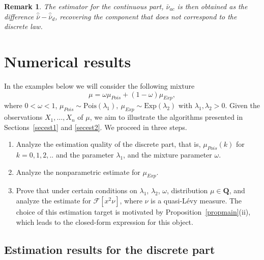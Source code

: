 \documentclass[numbers,webpdf,imaiai]{ima-authoring-template}%
\theoremstyle{thmstyletwo}%
\newtheorem{remark}{Remark}%
\newcommand{\R}{\mathbb{R}}
\newcommand{\F}{\mathcal{F}}
\newcommand{\Q}{\pmb{Q}}
\newcommand{\w}{\omega}
\numberwithin{equation}{section}
\begin{document}
\begin{remark}
The estimator for the continuous part, $\bar{\nu}_{ac}$ is then obtained as the difference $\widehat{\bar{\nu}} - \widehat{\bar{\nu}}_d$, recovering the component that does not correspond to the discrete law. %
\end{remark}

\section{Numerical results}\label{numerical_results}
In the examples below we will consider the following mixture
\begin{equation}\label{example_model}
    \mu = \w \mu_{Pois} + (1 - \w)\mu_{Exp},
\end{equation}
where $0 < \w < 1$, $\mu_{Pois}\sim\text{Pois}(\lambda_1),~\mu_{Exp}\sim\text{Exp}(\lambda_2)$ with $\lambda_1,\lambda_2>0$. 
Given the observations $X_1, \dots, X_n$ of $\mu$, we aim to illustrate the algorithms presented in Sections~\ref{secest1} and \ref{secest2}. We proceed in three steps.
\begin{enumerate}
    \item Analyze the estimation quality of the discrete part, that is, \(\mu_{Pois}(k)\) for \(k=0,1,2,..\) and the parameter $\lambda_1$, and the mixture parameter $\w$.
    \item Analyze the nonparametric estimate for  $\mu_{Exp}$.
    \item Prove that under certain conditions on $\lambda_1$, $\lambda_2$, $\w$, distribution $\mu \in \Q$, and analyze the estimate for  $\F[x^2\nu]$, where \(\nu\) is a quasi-L{\'e}vy measure. The choice of this estimation target is motivated by Proposition~\ref{propmain}(ii), which leads to the closed-form expression for this object.
\end{enumerate}

\subsection{Estimation results for the discrete part}
\end{document}
